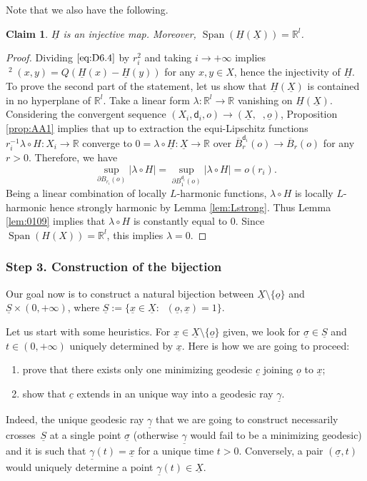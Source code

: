 \documentclass[10pt]{amsart}
\let\backslash\setminus
\theoremstyle{plain}
\newtheorem{claim}[theorem]{Claim}
\theoremstyle{definition}
\newcommand{\setR}{\mathbb{R}}
\newcommand{\dist}{\mathsf{d}}
\DeclareMathOperator{\Span}{Span}
\newcommand{\uX}{\underline{X}}
\newcommand{\usigma}{\underline{\sigma}}
\DeclareMathOperator{\udist}{\underline{\dist}}
\newcommand{\uo}{\underline{o}}
\newcommand{\ux}{\underline{x}}
\newcommand{\uc}{\underline{c}}
\newcommand{\uH}{\underline{H}}
\newcommand{\uS}{\underline{S}}
\newcommand{\ugamma}{\underline{\gamma}}
\begin{document}
Note that we also have the following.

\begin{claim}\label{uclaim}
$\uH$ is an injective map. Moreover, $\Span(\uH(\uX)) = \setR^l$.
\end{claim}

\begin{proof}
Dividing $\eqref{eq:D6.4}$ by $r_i^2$ and taking $i\to+\infty$ implies $\udist^2(x,y) = Q(\uH(x)-\uH(y))$ for any $x,y \in X$, hence the injectivity of $\uH$. To prove the second part of the statement, let us show that $\uH(\uX)$ is contained in no hyperplane of $\setR^l$. Take a linear form $\lambda:\setR^l\to\setR$ vanishing on $\uH(\uX)$. Considering the convergent sequence $(X_i,\dist_i,o)\to(\uX,\udist,\uo)$, Proposition \ref{prop:AA1} implies that up to extraction the equi-Lipschitz functions $r_i^{-1} \lambda \circ H: X_i \to \setR$ converge to $0=\lambda \circ \uH: \uX \to \setR$ over $\overline{B}^{\dist_i}_r(o) \to\overline{B}_r(o)$ for any $r>0$. Therefore, we have\vspace*{-4pt}
\[
\sup_{\partial B_{r_i}(o)} |\lambda \circ H| = \sup_{\partial B_1^{\dist_i}(o)} |\lambda \circ H|= o(r_i).
\]
Being a linear combination of locally $L$-harmonic functions, $\lambda \circ H$ is locally $L$-harmonic hence strongly harmonic by Lemma \ref{lem:Lstrong}. Thus Lemma \ref{lem:0109} implies that $\lambda \circ H$ is constantly equal to $0$. Since $\Span(H(X))=\setR^l$, this implies $\lambda = 0$.
\end{proof}

\subsubsection*{Step 3. Construction of the bijection}

Our goal now is to construct a natural bijection between $\uX \backslash \{\uo\}$ and $\uS \times (0,+\infty)$, where $\uS:=\{\ux \in \uX: \udist(\uo,\ux)=1\}$.

Let us start with some heuristics. For $\ux \in \uX \backslash \{\uo\}$ given, we look for $\usigma \in \uS$ and $t\in(0,+\infty)$ uniquely determined by $\ux$. Here is how we are going to proceed:

\begin{enumerate}
\item
prove that there exists only one minimizing geodesic $\uc$ joining $\uo$ to $\ux$;

\item
show that $\uc$ extends in an unique way into a geodesic ray $\ugamma$.
\end{enumerate}
\noindent Indeed, the unique geodesic ray $\ugamma$ that we are going to construct necessarily crosses~$\uS$ at a single point $\usigma$ (otherwise $\ugamma$ would fail to be a minimizing geodesic) and it is such that $\ugamma(t)=\ux$ for a unique time $t>0$. Conversely, a pair $(\usigma,t)$ would uniquely determine a point $\ugamma(t) \in \uX$.
\end{document}
